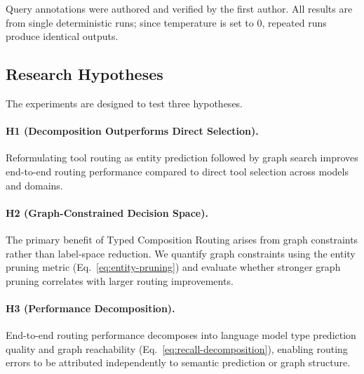 Query annotations were authored and verified by the first author.
All results are from single deterministic runs; since temperature is set to 0, repeated runs produce identical outputs.

\subsection{Research Hypotheses}
\label{sec:hypotheses}

The experiments are designed to test three hypotheses.

\paragraph{H1 (Decomposition Outperforms Direct Selection).}
Reformulating tool routing as entity prediction followed by graph search improves end-to-end routing performance compared to direct tool selection across models and domains.

\paragraph{H2 (Graph-Constrained Decision Space).}
The primary benefit of Typed Composition Routing arises from graph constraints rather than label-space reduction.
We quantify graph constraints using the entity pruning metric (Eq.~\ref{eq:entity-pruning}) and evaluate whether stronger graph pruning correlates with larger routing improvements.

\paragraph{H3 (Performance Decomposition).}
End-to-end routing performance decomposes into language model type prediction quality and graph reachability (Eq.~\ref{eq:recall-decomposition}), enabling routing errors to be attributed independently to semantic prediction or graph structure.
